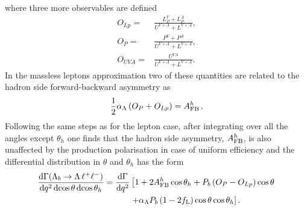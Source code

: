 where three more observables are defined
\begin{align}
O_{Lp}=&\frac{L_P^{V}+L_P^{A}}{U^{V+A}+L^{V+A}}, \nonumber \\
O_P=&\frac{P^{V}+P^{A}}{U^{V+A}+L^{V+A}}, \nonumber \\
O_{UVA}=&\frac{U^{VA}}{U^{V+A}+L^{V+A}}. \nonumber
\end{align}
%
In the massless leptons approximation two of these quantities are related to the hadron side
forward-backward asymmetry as
\begin{equation}
\frac{1}{2}\alpha_\Lambda \left(O_P+O_{Lp}\right)=A_{\rm FB}^h\,.
\end{equation}
%
Following the same steps as for the lepton case, after integrating over all the angles except $\theta_h$ one finds
that the hadron side asymmetry, $A_{\rm FB}^h$, is also unaffected by the production polarisation in case of uniform
efficiency and the differential distribution in $\theta$ and $\theta_h$ has the form
\begin{align}
\frac{\mathrm{d}\Gamma(\Lambda_{b}\rightarrow \Lambda \,\ell^{+}\ell^{-})}{\mathrm{d}q^2\,\mathrm{d}\!\cos\theta\,\mathrm{d}\!\cos\theta_h}=
\frac{\mathrm{d}\Gamma}{\mathrm{d}q^2}&\left[1+2A_{\rm FB}^h\cos\theta_h+P_b\left(O_P-O_{Lp}\right)\cos\theta\right.\nonumber \\
&\left.+\alpha_\Lambda P_b\left(1-2f_{\rm L}\right)\cos\theta\cos\theta_h\right].
\label{eq:hadron2D}
\end{align}

